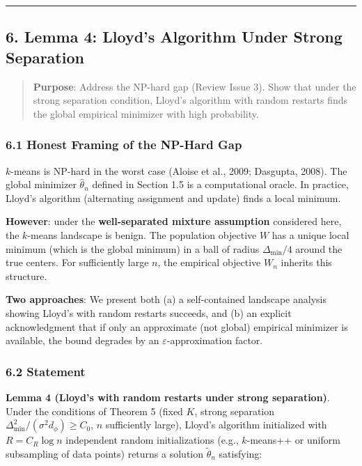 \documentclass[
  12pt,
]{article}
\begin{document}
\begin{center}\rule{0.5\linewidth}{0.5pt}\end{center}

\subsection{6. Lemma 4: Lloyd's Algorithm Under Strong
Separation}\label{lemma-4-lloyds-algorithm-under-strong-separation}

\begin{quote}
\textbf{Purpose}: Address the NP-hard gap (Review Issue 3). Show that
under the strong separation condition, Lloyd's algorithm with random
restarts finds the global empirical minimizer with high probability.
\end{quote}

\subsubsection{6.1 Honest Framing of the NP-Hard
Gap}\label{honest-framing-of-the-np-hard-gap}

\(k\)-means is NP-hard in the worst case (Aloise et al., 2009; Dasgupta,
2008). The global minimizer \(\hat{\theta}_n\) defined in Section 1.5 is
a computational oracle. In practice, Lloyd's algorithm (alternating
assignment and update) finds a local minimum.

\textbf{However}: under the \textbf{well-separated mixture assumption}
considered here, the \(k\)-means landscape is benign. The population
objective \(W\) has a unique local minimum (which is the global minimum)
in a ball of radius \(\Delta_{\min}/4\) around the true centers. For
sufficiently large \(n\), the empirical objective \(W_n\) inherits this
structure.

\textbf{Two approaches}: We present both (a) a self-contained landscape
analysis showing Lloyd's with random restarts succeeds, and (b) an
explicit acknowledgment that if only an approximate (not global)
empirical minimizer is available, the bound degrades by an
\(\varepsilon\)-approximation factor.

\subsubsection{6.2 Statement}\label{statement-3}

\textbf{Lemma 4 (Lloyd's with random restarts under strong separation)}.
Under the conditions of Theorem 5 (fixed \(K\), strong separation
\(\Delta_{\min}^2 / (\sigma^2 d_\phi) \geq C_0\), \(n\) sufficiently
large), Lloyd's algorithm initialized with \(R = C_R \log n\)
independent random initializations (e.g., \(k\)-means++ or uniform
subsampling of data points) returns a solution \(\tilde{\theta}_n\)
satisfying:
\end{document}
